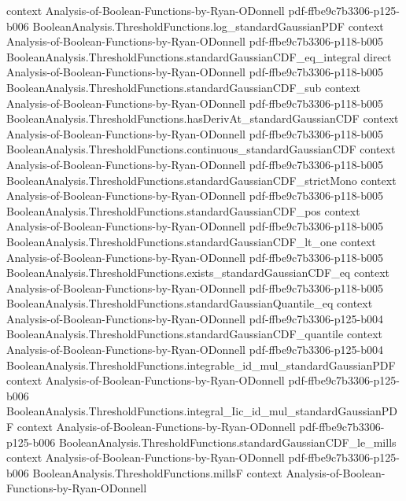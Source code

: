 \begin{theorem}
  {context}
  {Analysis-of-Boolean-Functions-by-Ryan-ODonnell}
  {pdf-ffbe9c7b3306-p125-b006}
\proofstep
  {BooleanAnalysis.ThresholdFunctions.log_standardGaussianPDF}
  {context}
  {Analysis-of-Boolean-Functions-by-Ryan-ODonnell}
  {pdf-ffbe9c7b3306-p118-b005}
\proofstep
  {BooleanAnalysis.ThresholdFunctions.standardGaussianCDF_eq_integral}
  {direct}
  {Analysis-of-Boolean-Functions-by-Ryan-ODonnell}
  {pdf-ffbe9c7b3306-p118-b005}
\proofstep
  {BooleanAnalysis.ThresholdFunctions.standardGaussianCDF_sub}
  {context}
  {Analysis-of-Boolean-Functions-by-Ryan-ODonnell}
  {pdf-ffbe9c7b3306-p118-b005}
\proofstep
  {BooleanAnalysis.ThresholdFunctions.hasDerivAt_standardGaussianCDF}
  {context}
  {Analysis-of-Boolean-Functions-by-Ryan-ODonnell}
  {pdf-ffbe9c7b3306-p118-b005}
\proofstep
  {BooleanAnalysis.ThresholdFunctions.continuous_standardGaussianCDF}
  {context}
  {Analysis-of-Boolean-Functions-by-Ryan-ODonnell}
  {pdf-ffbe9c7b3306-p118-b005}
\proofstep
  {BooleanAnalysis.ThresholdFunctions.standardGaussianCDF_strictMono}
  {context}
  {Analysis-of-Boolean-Functions-by-Ryan-ODonnell}
  {pdf-ffbe9c7b3306-p118-b005}
\proofstep
  {BooleanAnalysis.ThresholdFunctions.standardGaussianCDF_pos}
  {context}
  {Analysis-of-Boolean-Functions-by-Ryan-ODonnell}
  {pdf-ffbe9c7b3306-p118-b005}
\proofstep
  {BooleanAnalysis.ThresholdFunctions.standardGaussianCDF_lt_one}
  {context}
  {Analysis-of-Boolean-Functions-by-Ryan-ODonnell}
  {pdf-ffbe9c7b3306-p118-b005}
\proofstep
  {BooleanAnalysis.ThresholdFunctions.exists_standardGaussianCDF_eq}
  {context}
  {Analysis-of-Boolean-Functions-by-Ryan-ODonnell}
  {pdf-ffbe9c7b3306-p118-b005}
\proofstep
  {BooleanAnalysis.ThresholdFunctions.standardGaussianQuantile_eq}
  {context}
  {Analysis-of-Boolean-Functions-by-Ryan-ODonnell}
  {pdf-ffbe9c7b3306-p125-b004}
\proofstep
  {BooleanAnalysis.ThresholdFunctions.standardGaussianCDF_quantile}
  {context}
  {Analysis-of-Boolean-Functions-by-Ryan-ODonnell}
  {pdf-ffbe9c7b3306-p125-b004}
\proofstep
  {BooleanAnalysis.ThresholdFunctions.integrable_id_mul_standardGaussianPDF}
  {context}
  {Analysis-of-Boolean-Functions-by-Ryan-ODonnell}
  {pdf-ffbe9c7b3306-p125-b006}
\proofstep
  {BooleanAnalysis.ThresholdFunctions.integral_Iic_id_mul_standardGaussianPDF}
  {context}
  {Analysis-of-Boolean-Functions-by-Ryan-ODonnell}
  {pdf-ffbe9c7b3306-p125-b006}
\proofstep
  {BooleanAnalysis.ThresholdFunctions.standardGaussianCDF_le_mills}
  {context}
  {Analysis-of-Boolean-Functions-by-Ryan-ODonnell}
  {pdf-ffbe9c7b3306-p125-b006}
\proofstep
  {BooleanAnalysis.ThresholdFunctions.millsF}
  {context}
  {Analysis-of-Boolean-Functions-by-Ryan-ODonnell}

\end{theorem}
